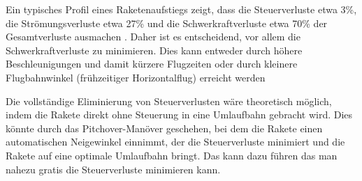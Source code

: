 Ein typisches Profil eines Raketenaufstiegs zeigt, dass die Steuerverluste etwa 3\%, die Strömungsverluste etwa 27\% und die Schwerkraftverluste etwa 70\% der Gesamtverluste ausmachen \cite{leo:astronautics}. 
%
Daher ist es entscheidend, vor allem die Schwerkraftverluste zu minimieren. 
Dies kann entweder durch höhere Beschleunigungen und damit kürzere Flugzeiten oder durch kleinere Flugbahnwinkel (frühzeitiger Horizontalflug) erreicht werden

Die vollständige Eliminierung von Steuerverlusten wäre theoretisch möglich, indem die Rakete direkt ohne Steuerung in eine Umlaufbahn gebracht wird. 
Dies könnte durch das Pitchover-Manöver geschehen, bei dem die Rakete einen automatischen Neigewinkel einnimmt, der die Steuerverluste minimiert und die Rakete auf eine optimale Umlaufbahn bringt. 
Das kann dazu führen das man nahezu gratis die Steuerverluste minimieren kann. 

